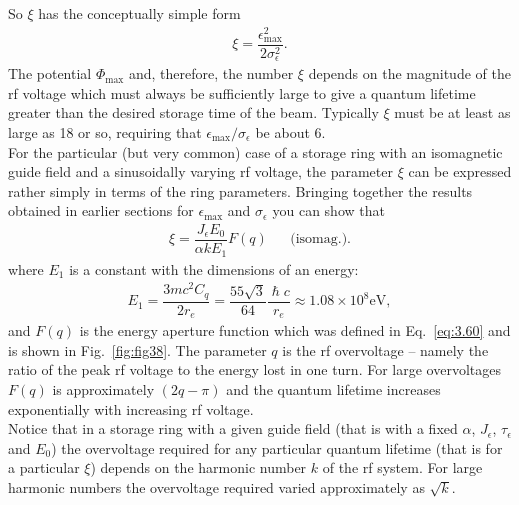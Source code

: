So $\xi$ has the conceptually simple form
\begin{align}
	\xi = \dfrac{\epsilon_\text{max}^2}{2\sigma_\epsilon^2}.
\end{align}
The potential $\Phi_\text{max}$ and, therefore, the number $\xi$ depends on the magnitude of the rf voltage which must always be sufficiently large to give a quantum lifetime greater than the desired storage time of the beam. Typically $\xi$ must be at least as large as 18 or so, requiring that $\epsilon_\text{max}/\sigma_\epsilon$ be about 6.\\
For the particular (but very common) case of a storage ring with an isomagnetic guide field and a sinusoidally varying rf voltage, the parameter $\xi$ can be expressed rather simply in terms of the ring parameters. Bringing together the results obtained in earlier sections for $\epsilon_\text{max}$ and $\sigma_\epsilon$ you can show that
\begin{align}
	\xi = \dfrac{J_\epsilon E_0}{\alpha k E_1} F(q) && \text{(isomag.)}.
\end{align}
where $E_1$ is a constant with the dimensions of an energy:
\begin{align}
	E_1 = \dfrac{3mc^2 C_q}{2 r_e} = \dfrac{55 \sqrt{3}}{64} \dfrac{\hslash c}{r_e} \approx 1.08 \times 10^8 \text{eV},
\end{align}
and $F(q)$ is the energy aperture function which was defined in Eq.~\eqref{eq:3.60} and is shown in Fig.~\ref{fig:fig38}. The parameter $q$ is the rf overvoltage -- namely the ratio of the peak rf voltage to the energy lost in one turn. For large overvoltages $F(q)$ is approximately $(2q- \pi)$ and the quantum lifetime increases exponentially with increasing rf voltage.\\
Notice that in a storage ring with a given guide field (that is with a fixed $\alpha$,
$J_\epsilon$, $\tau_\epsilon$ and $E_0$) the overvoltage required for any particular quantum lifetime (that is for a particular $\xi$) depends on the harmonic number $k$ of the rf system. For large harmonic numbers the overvoltage required varied approximately as $\sqrt{k}$.
